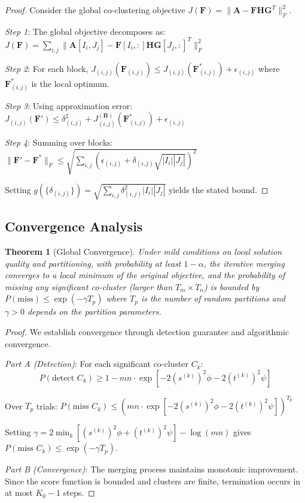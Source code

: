 \documentclass[journal]{IEEEtran}
\newtheorem{theorem}{Theorem}
\begin{document}
\begin{proof}
    {\color{blue}Consider the global co-clustering objective $J(\mathbf{F}) = \|\mathbf{A} - \mathbf{F}\mathbf{H}\mathbf{G}^T\|_F^2$.

        \textit{Step 1}: The global objective decomposes as: $J(\mathbf{F}) = \sum_{i,j} \|\mathbf{A}[I_i, J_j] - \mathbf{F}[I_i, :]\mathbf{H}\mathbf{G}[J_j, :]^T\|_F^2$

        \textit{Step 2}: For each block, $J_{(i,j)}(\mathbf{F}_{(i,j)}) \leq J_{(i,j)}(\mathbf{F}_{(i,j)}^*) + \epsilon_{(i,j)}$ where $\mathbf{F}_{(i,j)}^*$ is the local optimum.

        \textit{Step 3}: Using approximation error: $J_{(i,j)}(\mathbf{F}') \leq \delta_{(i,j)}^2 + J_{(i,j)}^{(\mathbf{B})}(\mathbf{F}_{(i,j)}^*) + \epsilon_{(i,j)}$

        \textit{Step 4}: Summing over blocks: $\|\mathbf{F}' - \mathbf{F}^*\|_F \leq \sqrt{\sum_{i,j} (\epsilon_{(i,j)} + \delta_{(i,j)}\sqrt{|I_i||J_j|})^2}$

        Setting $g(\{\delta_{(i,j)}\}) = \sqrt{\sum_{i,j} \delta_{(i,j)}^2|I_i||J_j|}$ yields the stated bound.}
\end{proof}

\subsection{Convergence Analysis}
\begin{theorem}[Global Convergence]
    \label{thm:global-convergence}
    Under mild conditions on local solution quality and partitioning, with probability at least $1-\alpha$, the iterative merging converges to a local minimum of the original objective, and the probability of missing any significant co-cluster (larger than $T_m \times T_n$) is bounded by $P(\text{miss}) \le \exp(-\gamma T_p)$ where $T_p$ is the number of random partitions and $\gamma > 0$ depends on the partition parameters.
\end{theorem}

\begin{proof}
    {\color{blue}We establish convergence through detection guarantee and algorithmic convergence.

        \textit{Part A (Detection)}: For each significant co-cluster $C_k$:
        $$P(\text{detect } C_k) \geq 1 - mn \cdot \exp\left[-2(s^{(k)})^2\phi - 2(t^{(k)})^2\psi\right]$$

        Over $T_p$ trials: $P(\text{miss } C_k) \leq \left(mn \cdot \exp\left[-2(s^{(k)})^2\phi - 2(t^{(k)})^2\psi\right]\right)^{T_p}$

        Setting $\gamma = 2\min_k[(s^{(k)})^2\phi + (t^{(k)})^2\psi] - \log(mn)$ gives $P(\text{miss } C_k) \leq \exp(-\gamma T_p)$.

        \textit{Part B (Convergence)}: The merging process maintains monotonic improvement. Since the score function is bounded and clusters are finite, termination occurs in at most $K_0 - 1$ steps.}
\end{proof}
\end{document}
